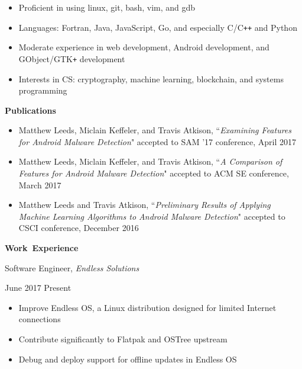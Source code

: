 \documentclass[11pt]{article}
\begin{document}
\begin{itemize}
  \item Proficient in using linux, git, bash, vim, and gdb
  \item Languages: Fortran, Java, JavaScript, Go, and especially C/C\texttt{++} and Python
  \item Moderate experience in web development, Android development, and GObject/GTK\texttt{+} development
  \item Interests in CS: cryptography, machine learning, blockchain, and systems programming
\end{itemize}

\vspace{0.8em}
\hbox{\large \textbf{Publications}}

\begin{itemize}[itemindent=0em]
  \item Matthew Leeds, Miclain Keffeler, and Travis Atkison, ``\textit{Examining Features for Android Malware Detection}" accepted to SAM '17 conference, April 2017
  \item Matthew Leeds, Miclain Keffeler, and Travis Atkison, ``\textit{A Comparison of Features for Android Malware Detection}" accepted to ACM SE conference, March 2017
  \item Matthew Leeds and Travis Atkison, ``\textit{Preliminary Results of Applying Machine Learning Algorithms to Android Malware Detection}" accepted to CSCI conference, December 2016
\end{itemize}

\vspace{0.8em}
\hbox{\large \textbf{Work Experience}}

\begin{minipage}[t]{0.65\textwidth}
\flushleft
Software Engineer, \textit{Endless Solutions}\\
\end{minipage}
\begin{minipage}[t]{0.30\textwidth}
\flushright
June 2017 \space \textemdash \space Present\\
\end{minipage}

\begin{itemize}
  \item Improve Endless OS, a Linux distribution designed for limited Internet connections
  \item Contribute significantly to Flatpak and OSTree upstream
  \item Debug and deploy support for offline updates in Endless OS
\end{itemize}
\end{document}
